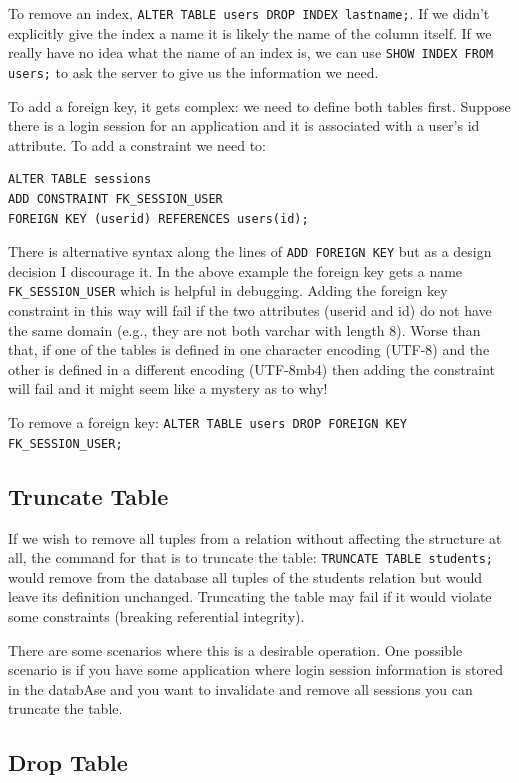 To remove an index, \texttt{ALTER TABLE users DROP INDEX lastname;}. If we didn't explicitly give the index a name it is likely the name of the column itself. If we really have no idea what the name of an index is, we can use \texttt{SHOW INDEX FROM users;} to ask the server to give us the information we need.

To add a foreign key, it gets complex: we need to define both tables first. Suppose there is a login session for an application and it is associated with a user's id attribute. To add a constraint we need to:

\begin{verbatim}
ALTER TABLE sessions
ADD CONSTRAINT FK_SESSION_USER
FOREIGN KEY (userid) REFERENCES users(id);
\end{verbatim}

There is alternative syntax along the lines of \texttt{ADD FOREIGN KEY} but as a design decision I discourage it. In the above example the foreign key gets a name \texttt{FK\_SESSION\_USER} which is helpful in debugging. Adding the foreign key constraint in this way will fail if the two attributes (userid and id) do not have the same domain (e.g., they are not both varchar with length 8). Worse than that, if one of the tables is defined in one character encoding (UTF-8) and the other is defined in a different encoding (UTF-8mb4) then adding the constraint will fail and it might seem like a mystery as to why!

To remove a foreign key: \texttt{ALTER TABLE users DROP FOREIGN KEY FK\_SESSION\_USER;}


\subsection*{Truncate Table}

If we wish to remove all tuples from a relation without affecting the structure at all, the command for that is to truncate the table: \texttt{TRUNCATE TABLE students;} would remove from the database all tuples of the students relation but would leave its definition unchanged. Truncating the table may fail if it would violate some constraints (breaking referential integrity).

There are some scenarios where this is a desirable operation. One possible scenario is if you have some application where login session information is stored in the databAse and you want to invalidate and remove all sessions you can truncate the table.

\subsection*{Drop Table}

